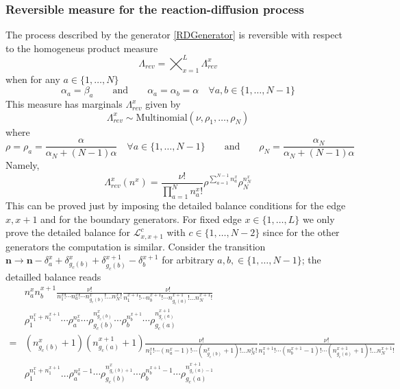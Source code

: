 \documentclass[10pt]{article}
\numberwithin{equation}{section}
\numberwithin{equation}{subsection}
\newcommand{\twoj}{\nu}
\begin{document}
\subsubsection{Reversible measure for the reaction-diffusion process} 
The process described by the generator \eqref{RDGenerator} is reversible with respect to the homogeneus product measure \begin{equation}\label{reversibleMeasureRD}
	\Lambda_{rev}=\bigtimes_{x=1}^{L}\Lambda_{rev}^{x}
\end{equation}
when for any $a\in\{1,\ldots,N\}$
\begin{equation}\label{reversibilityConditionRD}
	\alpha_{a}=\beta_{a}\qquad\text{and}\qquad \alpha_{a}=\alpha_{b}=\alpha \quad \forall a,b\in \{1,\ldots,N-1\}
\end{equation}
This measure has marginals $\Lambda_{rev}^{x}$ given by 
\begin{equation}
	\Lambda^{x}_{rev}\sim \text{Multinomial}\left(\twoj,\rho_{1},\ldots,\rho_{N}\right)
\end{equation}
where 
\begin{equation}
	\rho=\rho_{a}=\frac{\alpha}{\alpha_{N}+(N-1)\alpha}\quad \forall a\in \{1,\ldots,N-1\}\qquad \text{and}\qquad \rho_{N}=\frac{\alpha_{N}}{\alpha_{N}+(N-1)\alpha}
\end{equation}
Namely,
\begin{equation}
	\Lambda_{rev}^{x}(n^{x})=\frac{\nu!}{\prod_{a=1}^{N}n_{a}^{x}!}\rho^{\sum_{a=1}^{N-1}n_{a}^{x}}\rho_{N}^{n_{N}^{x}}
\end{equation}
This can be proved just by imposing the detailed balance conditions for the edge $x,x+1$ and for the boundary generators. For fixed edge $x\in \{1,\ldots,L\}$ we only prove the detailed balance for  $\mathcal{L}_{x,x+1}^{c}$ with $c\in\{1,\ldots,N-2\}$ since for the other generators the computation is similar. Consider the transition $\bm{n}\to \bm{n}-\delta_{a}^{x}+\delta_{g_{c}(b)}^{x}+\delta_{g_{c}(b)}^{x+1}-\delta_{b}^{x+1}$ for arbitrary $a,b,\in\{1,\ldots,N-1\}$; the detailled balance reads
\begin{equation}
	\begin{split}
		&n_{a}^{x}n_{b}^{x+1}\frac{\nu!}{n_{1}^{x}!\cdots n_{a}^{x}!\cdots n_{g_{c}(b)}^{x}!\ldots n_{N}^{x}!}\frac{\nu!}{n_{1}^{x+1}!\cdots n_{b}^{x+1}!\cdots n_{g_{c}(a)}^{x+1}!\ldots n_{N}^{x+1}!}\\&\rho_{1}^{n_{1}^{x}+n_{1}^{x+1}}\cdots \rho_{a}^{n_{a}^{x}}\cdots\rho_{g_{c}(b)}^{n_{g_{c}(b)}^{x}}\cdots\rho_{b}^{n_{b}^{x+1}}\cdots \rho_{g_{c}(a)}^{n_{g_{c}(a)}^{x+1}}
		\\
		=&(n_{g_{c}(b)}^{x}+1)(n_{g_{c}(a)}^{x+1}+1)\frac{\nu!}{n_{1}^{x}!\cdots (n_{a}^{x}-1)!\cdots (n_{g_{c}(b)}^{x}+1)!\ldots n_{N}^{x}!}\frac{\nu!}{n_{1}^{x+1}!\cdots (n_{b}^{x+1}-1)!\cdots (n_{g_{c}(a)}^{x+1}+1)!\ldots n_{N}^{x+1}!}
		\\&
		\rho_{1}^{n_{1}^{x}+n_{1}^{x+1}}\ldots \rho_{a}^{n_{a}^{x}-1}\cdots\rho_{g_{c}(b)}^{n_{g_{c}(b)+1}^{x}}\cdots\rho_{b}^{n_{b}^{x+1}-1}\cdots \rho_{g_{c}(a)}^{n_{g_{c}(a)-1}^{x+1}}
	\end{split}
\end{equation}
\end{document}
